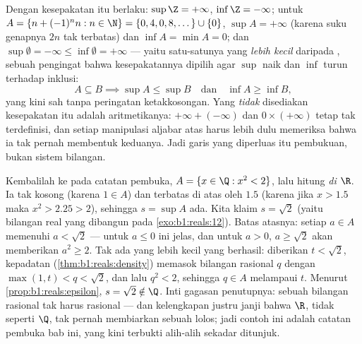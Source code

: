 \begin{example}\label{ex:b1:reals:extendedcompute}
Dengan kesepakatan itu berlaku: $\sup \Z = +\infty$, $\inf \Z =
-\infty$; untuk $A = \{n + (-1)^n n : n \in \N\} = \{0, 4, 0, 8,
\dots\} \cup \{0\}$, $\sup A = +\infty$ (karena suku genapnya $2n$
tak terbatas) dan $\inf A = \min A = 0$; dan $\sup\emptyset =
-\infty \leq \inf\emptyset = +\infty$ --- yaitu satu-satunya  yang
 \emph{lebih kecil} daripada , sebuah pengingat bahwa
kesepakatannya dipilih agar $\sup$ naik dan $\inf$
turun terhadap inklusi:
\[
A \subseteq B \implies \sup A \leq \sup B
\quad\text{dan}\quad \inf A \geq \inf B ,
\]
yang kini sah tanpa peringatan ketakkosongan. Yang \emph{tidak}
disediakan kesepakatan itu adalah aritmetikanya: $+\infty + (-\infty)$ dan $0
\times (+\infty)$ tetap tak terdefinisi, dan setiap manipulasi aljabar
atas  harus lebih dulu memeriksa bahwa ia tak pernah membentuk keduanya.
Jadi garis yang diperluas itu pembukuan, bukan sistem bilangan.
\end{example}

\begin{example}\label{ex:b1:reals:supescape}
Kembalilah ke  pada catatan pembuka, $A = \{x \in \Q : x^2 <
2\}$, lalu hitung  \emph{di $\R$}. Ia tak kosong
(karena $1 \in A$) dan terbatas di atas oleh $1.5$ (karena jika $x > 1.5$ maka $x^2 >
2.25 > 2$), sehingga $s = \sup A$ ada. Kita klaim $s = \sqrt 2$ (yaitu
bilangan real yang dibangun pada \cref{exo:b1:reals:12}). Batas atasnya: setiap
$a \in A$ memenuhi $a < \sqrt2$ --- untuk $a \leq 0$ ini
jelas, dan untuk $a > 0$, $a \geq \sqrt2$ akan memberikan $a^2 \geq 2$.
Tak ada yang lebih kecil yang berhasil: diberikan $t < \sqrt2$, kepadatan
(\cref{thm:b1:reals:density}) memasok bilangan rasional $q$ dengan
$\max(1, t) < q < \sqrt 2$, dan lalu $q^2 < 2$, sehingga $q \in A$
melampaui $t$. Menurut \cref{prop:b1:reals:epsilon}, $s = \sqrt2
\notin \Q$. Inti gagasan penutupnya:  sebuah 
bilangan rasional tak harus rasional --- dan kelengkapan justru
janji bahwa $\R$, tidak seperti $\Q$, tak pernah membiarkan sebuah  lolos;
jadi contoh ini adalah catatan pembuka bab ini, yang kini terbukti
alih-alih sekadar ditunjuk.
\end{example}

